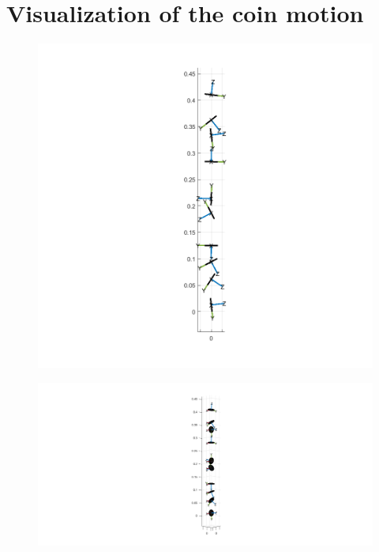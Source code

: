 \documentclass[11pt]{myclass}
\begin{document}
\section{Visualization of the coin motion}
\begin{figure}[H]
\includegraphics[scale = 0.85]{free_fall_projection.png}
\end{figure}
\begin{figure}[H]
\includegraphics[scale = 0.5]{free_fall_isometric.png}
\end{figure}
\end{document}
